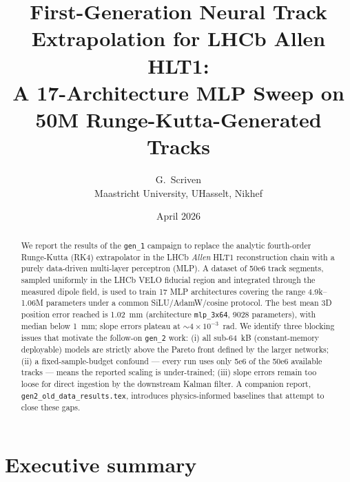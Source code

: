 \documentclass[a4paper,11pt]{article}
\title{First-Generation Neural Track Extrapolation for LHCb Allen HLT1:\\
A 17-Architecture MLP Sweep on 50M Runge-Kutta-Generated Tracks}
\author{G.~Scriven\\\small Maastricht University, UHasselt, Nikhef}
\date{April 2026}
\newcommand{\SI}[2]{#1~#2}
\newcommand{\num}[1]{#1}
\newcommand{\kilo}{k}
\newcommand{\byte}{B}
\newcommand{\mm}{mm}
\begin{document}
\maketitle

\begin{abstract}
We report the results of the \texttt{gen\_1} campaign to replace the analytic
fourth-order Runge-Kutta (RK4) extrapolator in the LHCb \emph{Allen} HLT1
reconstruction chain with a purely data-driven multi-layer perceptron (MLP).
A dataset of \num{50e6} track segments, sampled uniformly in the LHCb VELO
fiducial region and integrated through the measured dipole field, is used to
train 17 MLP architectures covering the range 4.9k--1.06M parameters under a
common SiLU/AdamW/cosine protocol. The best mean 3D position error reached is
\SI{1.02}{\mm} (architecture \texttt{mlp\_3x64}, \num{9028} parameters),
with median below \SI{1}{\mm}; slope errors plateau at $\sim
4\!\times\!10^{-3}$~rad.  We identify three blocking issues that motivate the
follow-on \texttt{gen\_2} work: (i) all sub-\SI{64}{\kilo\byte} (constant-memory
deployable) models are strictly above the Pareto front defined by the larger
networks; (ii) a fixed-sample-budget confound --- every run uses only
\num{5e6} of the \num{50e6} available tracks --- means the reported scaling
is under-trained; (iii) slope errors remain too loose for direct ingestion
by the downstream Kalman filter.  A companion report,
\texttt{gen2\_old\_data\_results.tex}, introduces physics-informed baselines
that attempt to close these gaps.
\end{abstract}

\section*{Executive summary}
\end{document}
